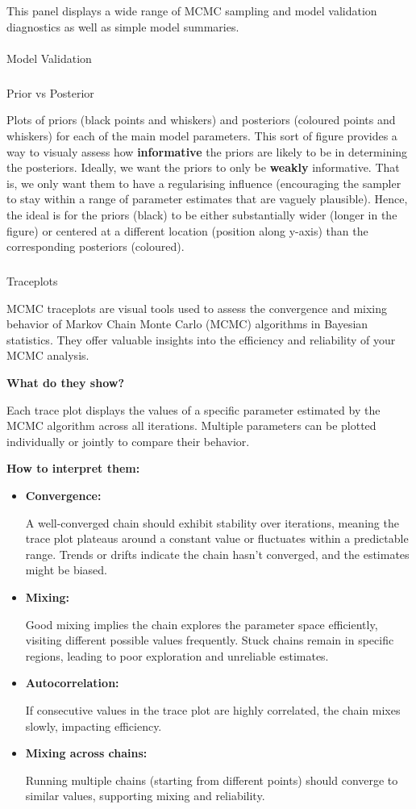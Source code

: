\documentclass[
  8pt,
  a4paper]{article}
\makeatletter
\let\oldparagraph\paragraph
\renewcommand{\paragraph}{
    \@ifstar
      \xxxParagraphStar
      \xxxParagraphNoStar
  }
\newcommand{\xxxParagraphStar}[1]{\oldparagraph*{#1}\mbox{}}
\newcommand{\xxxParagraphNoStar}[1]{\oldparagraph{#1}\mbox{}}
\let\oldsubparagraph\subparagraph
\renewcommand{\subparagraph}{
    \@ifstar
      \xxxSubParagraphStar
      \xxxSubParagraphNoStar
  }
\newcommand{\xxxSubParagraphStar}[1]{\oldsubparagraph*{#1}\mbox{}}
\newcommand{\xxxSubParagraphNoStar}[1]{\oldsubparagraph{#1}\mbox{}}
\makeatother
\begin{document}
This panel displays a wide range of MCMC sampling and model validation
diagnostics as well as simple model summaries.

\paragraph{Model Validation}\label{sec-validation}

\subparagraph{Prior vs Posterior}\label{prior-vs-posterior}

Plots of priors (black points and whiskers) and posteriors (coloured
points and whiskers) for each of the main model parameters. This sort of
figure provides a way to visualy assess how \textbf{informative} the
priors are likely to be in determining the posteriors. Ideally, we want
the priors to only be \textbf{weakly} informative. That is, we only want
them to have a regularising influence (encouraging the sampler to stay
within a range of parameter estimates that are vaguely plausible).
Hence, the ideal is for the priors (black) to be either substantially
wider (longer in the figure) or centered at a different location
(position along y-axis) than the corresponding posteriors (coloured).

\subparagraph{Traceplots}\label{traceplots}

MCMC traceplots are visual tools used to assess the convergence and
mixing behavior of Markov Chain Monte Carlo (MCMC) algorithms in
Bayesian statistics. They offer valuable insights into the efficiency
and reliability of your MCMC analysis.

\textbf{What do they show?}

Each trace plot displays the values of a specific parameter estimated by
the MCMC algorithm across all iterations. Multiple parameters can be
plotted individually or jointly to compare their behavior.

\textbf{How to interpret them:}

\begin{itemize}
\item
  \textbf{Convergence:}

  A well-converged chain should exhibit stability over iterations,
  meaning the trace plot plateaus around a constant value or fluctuates
  within a predictable range. Trends or drifts indicate the chain hasn't
  converged, and the estimates might be biased.
\item
  \textbf{Mixing:}

  Good mixing implies the chain explores the parameter space
  efficiently, visiting different possible values frequently. Stuck
  chains remain in specific regions, leading to poor exploration and
  unreliable estimates.
\item
  \textbf{Autocorrelation:}

  If consecutive values in the trace plot are highly correlated, the
  chain mixes slowly, impacting efficiency.
\item
  \textbf{Mixing across chains:}

  Running multiple chains (starting from different points) should
  converge to similar values, supporting mixing and reliability.
\end{itemize}
\end{document}
